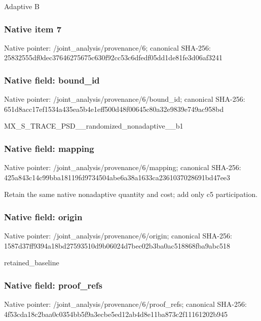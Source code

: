\documentclass[10pt,a4paper]{article}
\begin{document}
\begingroup\raggedright\sloppy Adaptive B\par\endgroup

\subsubsection{Native item 7}
Native pointer: /joint\_\allowbreak{}analysis/provenance/6; canonical SHA-256: 25832555df0dec37646275675c630f92cc53c6dfedf05dd1de81fe3d06af3241

\subsubsection{Native field: bound\_\allowbreak{}id}
Native pointer: /joint\_\allowbreak{}analysis/provenance/6/bound\_\allowbreak{}id; canonical SHA-256: 651d8acc17ef1534a435ea5b4e1eff500d48f00645c80a32e9839e749ac958bd

\begingroup\raggedright\sloppy MX\_\allowbreak{}S\_\allowbreak{}TRACE\_\allowbreak{}PSD\_\allowbreak{}\_\allowbreak{}randomized\_\allowbreak{}nonadaptive\_\allowbreak{}\_\allowbreak{}b1\par\endgroup

\subsubsection{Native field: mapping}
Native pointer: /joint\_\allowbreak{}analysis/provenance/6/mapping; canonical SHA-256: 425a843c14c99bba18119fd9734504abe6a38a1633ca2361037028691bd47ee3

\begingroup\raggedright\sloppy Retain the same native nonadaptive quantity and cost;\allowbreak{} add only c5 participation.\par\endgroup

\subsubsection{Native field: origin}
Native pointer: /joint\_\allowbreak{}analysis/provenance/6/origin; canonical SHA-256: 1587d37ff9394a18bd27593510d9b06024d7bec02b3ba0ac518868fba9abc518

\begingroup\raggedright\sloppy retained\_\allowbreak{}baseline\par\endgroup

\subsubsection{Native field: proof\_\allowbreak{}refs}
Native pointer: /joint\_\allowbreak{}analysis/provenance/6/proof\_\allowbreak{}refs; canonical SHA-256: 4f53cda18c2baa0c0354bb5f9a3ecbe5ed12ab4d8e11ba873c2f11161202b945
\end{document}
